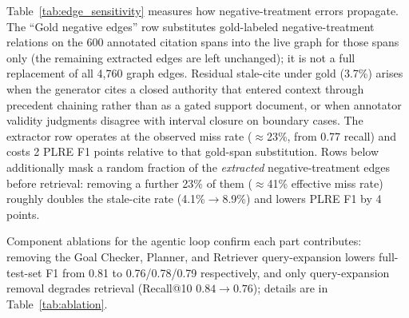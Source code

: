 Table~\ref{tab:edge_sensitivity} measures how negative-treatment errors propagate. The ``Gold negative edges'' row substitutes gold-labeled negative-treatment relations on the 600 annotated citation spans into the live graph for those spans only (the remaining extracted edges are left unchanged); it is not a full replacement of all 4{,}760 graph edges. Residual stale-cite under gold (3.7\%) arises when the generator cites a closed authority that entered context through precedent chaining rather than as a gated support document, or when annotator validity judgments disagree with interval closure on boundary cases. The extractor row operates at the observed miss rate ($\approx$23\%, from 0.77 recall) and costs 2 PLRE F1 points relative to that gold-span substitution. Rows below additionally mask a random fraction of the \emph{extracted} negative-treatment edges before retrieval: removing a further 23\% of them ($\approx$41\% effective miss rate) roughly doubles the stale-cite rate (4.1\%$\rightarrow$8.9\%) and lowers PLRE F1 by 4 points.

\begin{table}[t]
\centering
\caption{Edge-error propagation audit. Gold row substitutes labels on the 600 annotated spans only. ``Mask $x$\%'' rows also remove $x$\% of extracted negative-treatment edges (closures or down-weights). Effective miss rate $\approx1-0.77(1-x)$ from the extractor's 0.77 recall; $\Delta$F1 is relative to the extractor row.}
\label{tab:edge_sensitivity}
\small
\setlength{\tabcolsep}{4pt}
\end{table}

Component ablations for the agentic loop confirm each part contributes: removing the Goal Checker, Planner, and Retriever query-expansion lowers full-test-set F1 from 0.81 to 0.76/0.78/0.79 respectively, and only query-expansion removal degrades retrieval (Recall@10 $0.84\!\rightarrow\!0.76$); details are in Table~\ref{tab:ablation}.

